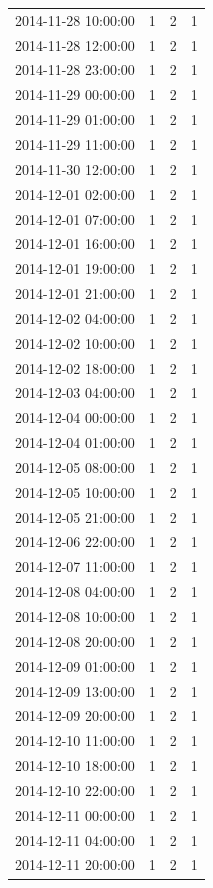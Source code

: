 \begin{tabular}{lrrr}
2014-11-28 10:00:00 & 1 & 2 & 1 \\
2014-11-28 12:00:00 & 1 & 2 & 1 \\
2014-11-28 23:00:00 & 1 & 2 & 1 \\
2014-11-29 00:00:00 & 1 & 2 & 1 \\
2014-11-29 01:00:00 & 1 & 2 & 1 \\
2014-11-29 11:00:00 & 1 & 2 & 1 \\
2014-11-30 12:00:00 & 1 & 2 & 1 \\
2014-12-01 02:00:00 & 1 & 2 & 1 \\
2014-12-01 07:00:00 & 1 & 2 & 1 \\
2014-12-01 16:00:00 & 1 & 2 & 1 \\
2014-12-01 19:00:00 & 1 & 2 & 1 \\
2014-12-01 21:00:00 & 1 & 2 & 1 \\
2014-12-02 04:00:00 & 1 & 2 & 1 \\
2014-12-02 10:00:00 & 1 & 2 & 1 \\
2014-12-02 18:00:00 & 1 & 2 & 1 \\
2014-12-03 04:00:00 & 1 & 2 & 1 \\
2014-12-04 00:00:00 & 1 & 2 & 1 \\
2014-12-04 01:00:00 & 1 & 2 & 1 \\
2014-12-05 08:00:00 & 1 & 2 & 1 \\
2014-12-05 10:00:00 & 1 & 2 & 1 \\
2014-12-05 21:00:00 & 1 & 2 & 1 \\
2014-12-06 22:00:00 & 1 & 2 & 1 \\
2014-12-07 11:00:00 & 1 & 2 & 1 \\
2014-12-08 04:00:00 & 1 & 2 & 1 \\
2014-12-08 10:00:00 & 1 & 2 & 1 \\
2014-12-08 20:00:00 & 1 & 2 & 1 \\
2014-12-09 01:00:00 & 1 & 2 & 1 \\
2014-12-09 13:00:00 & 1 & 2 & 1 \\
2014-12-09 20:00:00 & 1 & 2 & 1 \\
2014-12-10 11:00:00 & 1 & 2 & 1 \\
2014-12-10 18:00:00 & 1 & 2 & 1 \\
2014-12-10 22:00:00 & 1 & 2 & 1 \\
2014-12-11 00:00:00 & 1 & 2 & 1 \\
2014-12-11 04:00:00 & 1 & 2 & 1 \\
2014-12-11 20:00:00 & 1 & 2 & 1 \\

\end{tabular}
